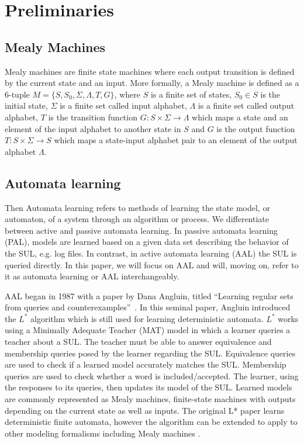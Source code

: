 \documentclass[runningheads]{llncs}
\begin{document}
\section{Preliminaries} \label{chap:2} %
\subsection{Mealy Machines}
Mealy machines are finite state machines where each output transition is defined by the current state and an input. More formally, a Mealy machine is defined as a 6-tuple $M = \{S, S_0, \Sigma, \Lambda, T, G\}$, where $S$ is a finite set of states, $S_0 \in S$ is the initial state, $\Sigma$ is a finite set called input alphabet, $\Lambda$ is a finite set called output alphabet, $T$ is the transition function $G: S \times \Sigma \rightarrow \Lambda$ which maps a state and an element of the input alphabet to another state in $S$ and $G$ is the output function $T: S \times \Sigma \rightarrow S$ which maps a state-input alphabet pair to an element of the output alphabet $\Lambda$.

\subsection{Automata learning}Then
Automata learning refers to methods of learning the state model, or automaton, of a system through an algorithm or process. We differentiate between active and passive automata learning. In passive automata learning (PAL), models are learned based on a given data set describing the behavior of the SUL, e.g. log files. In contrast, in active automata learning (AAL) the SUL is queried directly. In this paper, we will focus on AAL and will, moving on, refer to it as automata learning or AAL interchangeably. 

AAL began in 1987 with a paper by Dana Angluin, titled ``Learning regular sets from queries and counterexamples''~\cite{ANGLUIN198787}. In this seminal paper, Angluin introduced the $L^*$ algorithm which is still used for learning deterministic automata. $L^*$ works using a Minimally Adequate Teacher (MAT) model in which a learner queries a teacher about a SUL. The teacher must be able to answer equivalence and membership queries posed by the learner regarding the SUL. Equivalence queries are used to check if a learned model accurately matches the SUL. Membership queries are used to check whether a word is included/accepted. The learner, using the responses to its queries, then updates its model of the SUL. Learned models are commonly represented as Mealy machines, finite-state machines with outputs depending on the current state as well as inputs. The original L* paper learns deterministic finite automata, however the algorithm can be extended to apply to other modeling formalisms including Mealy machines \cite{ShahbazG09}.%
\end{document}
